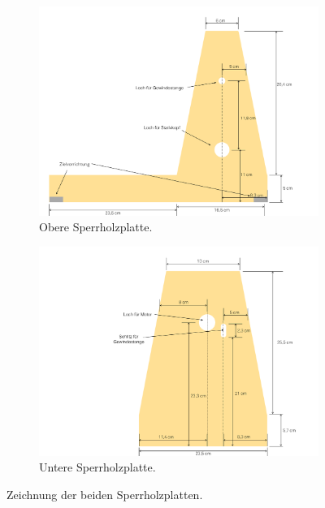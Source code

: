 \begin{figure}\centering%
\begin{subfigure}{0.75\columnwidth}
\includegraphics[width=\linewidth]{images/NachfuehrungSchemaOben.pdf}%
\caption{Obere Sperrholzplatte.}
\end{subfigure}

\begin{subfigure}{0.75\columnwidth}
\includegraphics[width=\linewidth]{images/NachfuehrungSchemaUnten.pdf}%
\caption{Untere Sperrholzplatte.}
\end{subfigure}
\caption{Zeichnung der beiden Sperrholzplatten.}%
\label{Schema}
\end{figure}

